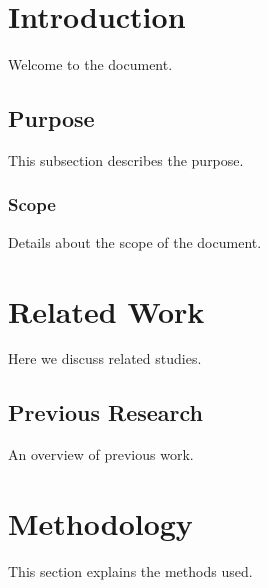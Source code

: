 \documentclass{article}
\renewcommand{\contentsname}{Table of Contents}
\begin{document}
\tableofcontents


\newpage

\section{Introduction}
Welcome to the document.

\subsection{Purpose}
This subsection describes the purpose.

\subsubsection{Scope}
Details about the scope of the document.

\section{Related Work}
Here we discuss related studies.

\subsection{Previous Research}
An overview of previous work.

\section{Methodology}
This section explains the methods used.
\end{document}
